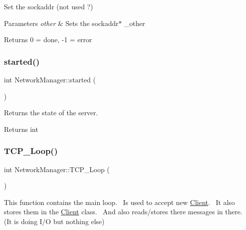 Set the sockaddr (not used ?) 
\begin{DoxyParams}{Parameters}
{\em other} & Sets the sockaddr$\ast$ \+\_\+other \\
\hline
\end{DoxyParams}
\begin{DoxyReturn}{Returns}
0 = done, -\/1 = error 
\end{DoxyReturn}
\mbox{\label{classNetworkManager_a5765a63a11c9b5ee4dfb1f264ca002eb}} 
\subsubsection{\texorpdfstring{started()}{started()}}
{\footnotesize\ttfamily int Network\+Manager\+::started (\begin{DoxyParamCaption}{ }\end{DoxyParamCaption})}



Returns the state of the server. 

\begin{DoxyReturn}{Returns}
int 
\end{DoxyReturn}
\mbox{\label{classNetworkManager_a1979812356b715646302bf188f74aff5}} 
\subsubsection{\texorpdfstring{TCP\_Loop()}{TCP\_Loop()}}
{\footnotesize\ttfamily int Network\+Manager\+::\+T\+C\+P\+\_\+\+Loop (\begin{DoxyParamCaption}{ }\end{DoxyParamCaption})}



This function contains the main loop.~\newline
 Is used to accept new \mbox{\hyperlink{classClient}{Client}}.~\newline
 It also stores them in the \mbox{\hyperlink{classClient}{Client}} class.~\newline
 And also reads/stores there messages in there.~\newline
 (It is doing I/O but nothing else)~\newline
 


